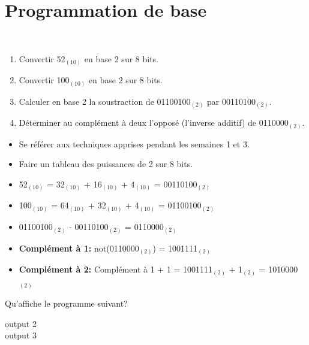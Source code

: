 \section{Programmation de base}

\begin{Exercice}[10 minutes]\\
    \begin{enumerate}
        \item Convertir 52$_{(10)}$ en base 2 sur 8 bits.
        \item Convertir 100$_{(10)}$ en base 2 sur 8 bits.
        \item Calculer en base 2 la soustraction de 01100100$_{(2)}$ par 00110100$_{(2)}$.
        \item Déterminer au complément à deux l'opposé (l'inverse additif) de 0110000$_{(2)}$.
    \end{enumerate}
\begin{conseil}
   \begin{itemize}
        \item Se référer aux techniques apprises pendant les semaines 1 et 3.
       \item Faire un tableau des puissances de 2 sur 8 bits.
   \end{itemize}
\end{conseil}
    
\begin{solution}
\begin{itemize}
    \item 52$_{(10)}$ = 32$_{(10)}$ + 16$_{(10)}$ + 4$_{(10)}$ = 00110100$_{(2)}$
    \item 100$_{(10)}$ = 64$_{(10)}$ + 32$_{(10)}$ + 4$_{(10)}$ = 01100100$_{(2)}$
    \item 01100100$_{(2)}$ - 00110100$_{(2)}$ = 0110000$_{(2)}$
    \item \textbf{Complément à 1:} not(0110000$_{(2)}$) = 1001111$_{(2)}$ 
    \item \textbf{Complément à 2:} Complément à 1 + 1 = 1001111$_{(2)}$ + 1$_{(2)}$ = 1010000$_{(2)}$
\end{itemize}   
\end{solution}

\end{Exercice}

\begin{Exercice}[5 minutes]
    Qu'affiche le programme suivant?
    

    \begin{solution}
        output 2 \\
        output 3
    \end{solution}
\end{Exercice}

